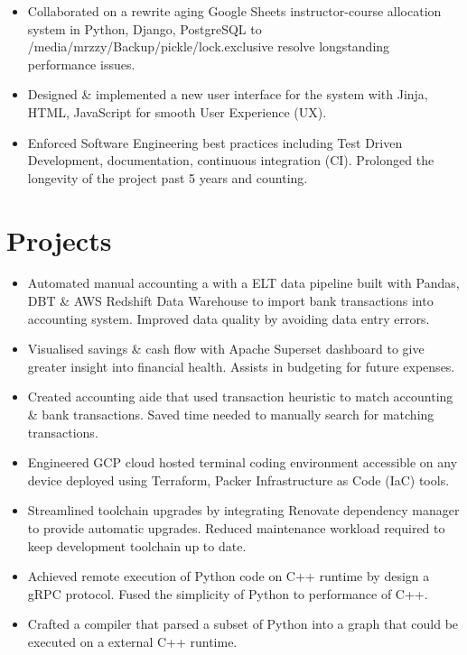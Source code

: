 \begin{itemize}
  \item Collaborated on a rewrite aging Google Sheets instructor-course allocation system in Python, Django, PostgreSQL to 
 /media/mrzzy/Backup/pickle/lock.exclusive   resolve longstanding performance issues. 
  \item Designed \& implemented a new user interface 
    for the system with Jinja, HTML, JavaScript for smooth User Experience (UX).
  \item Enforced Software Engineering best practices including Test Driven Development,
    documentation, continuous integration (CI). Prolonged the longevity of the project
    past 5 years and counting.
\end{itemize}

\section{Projects}

\begin{itemize}
  \item Automated manual accounting a with a ELT data pipeline built with Pandas, DBT \& AWS Redshift Data Warehouse to import bank transactions into accounting system. Improved data quality by avoiding data entry errors.
  \item Visualised savings \& cash flow with Apache Superset dashboard to give greater insight into financial health. Assists in budgeting for future expenses.
  \item Created accounting aide that used transaction heuristic to match accounting \& bank transactions. Saved time needed to manually search for matching transactions.
\end{itemize}

\begin{itemize}
  \item Engineered GCP cloud hosted terminal coding environment accessible on any device deployed using Terraform,
    Packer Infrastructure as Code (IaC) tools.
  \item Streamlined toolchain upgrades by integrating Renovate dependency manager to provide automatic upgrades. Reduced maintenance workload required to keep development toolchain up to date.
\end{itemize}
\begin{itemize}
\item Achieved remote execution of Python code on C++ runtime by design a gRPC protocol. Fused the simplicity of Python to performance of C++.
\item Crafted a compiler that parsed a subset of Python into a graph that could be executed on a external C++ runtime.
\end{itemize}
  
